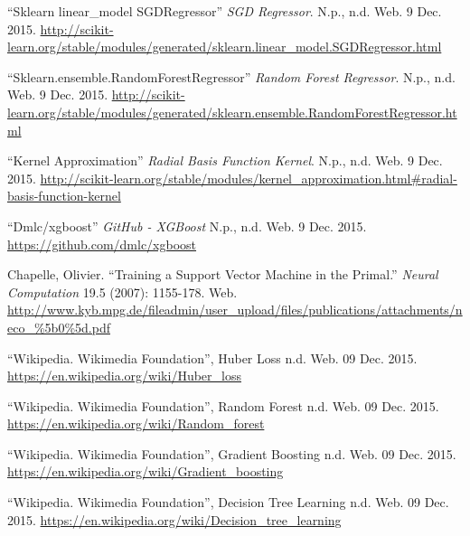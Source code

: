 \documentclass[12pt,a4paper]{article}
\begin{document}
\begin{thebibliography}{9}
	\enquote{Sklearn linear\_model SGDRegressor} \textit{SGD Regressor}. N.p., n.d. Web. 9 Dec. 2015. \href{http://scikit-learn.org/stable/modules/generated/sklearn.linear_model.SGDRegressor.html}{\url{http://scikit-learn.org/stable/modules/generated/sklearn.linear_model.SGDRegressor.html}}
	
	\enquote{Sklearn.ensemble.RandomForestRegressor} \textit{Random Forest Regressor}. N.p., n.d. Web. 9 Dec. 2015. \href{http://scikit-learn.org/stable/modules/generated/sklearn.ensemble.RandomForestRegressor.html}{\url{http://scikit-learn.org/stable/modules/generated/sklearn.ensemble.RandomForestRegressor.html}}
	
	\enquote{Kernel Approximation} \textit{Radial Basis Function Kernel}. N.p., n.d. Web. 9 Dec. 2015. \href{http://scikit-learn.org/stable/modules/kernel_approximation.html\#radial-basis-function-kernel}{\url{http://scikit-learn.org/stable/modules/kernel_approximation.html\#radial-basis-function-kernel}}
	
	
	\enquote{Dmlc/xgboost} \textit{GitHub - XGBoost} N.p., n.d. Web. 9 Dec. 2015. \href{https://github.com/dmlc/xgboost}{\url{https://github.com/dmlc/xgboost}}
	
	Chapelle, Olivier. \enquote{Training a Support Vector Machine in the Primal.} \textit{Neural Computation} 19.5 (2007): 1155-178. Web.
	\href{http://www.kyb.mpg.de/fileadmin/user_upload/files/publications/attachments/neco_\%5b0\%5d.pdf}{\url{http://www.kyb.mpg.de/fileadmin/user_upload/files/publications/attachments/neco_\%5b0\%5d.pdf}}
	
	\enquote{Wikipedia. Wikimedia Foundation}, Huber Loss n.d. Web. 09 Dec. 2015. \href{https://en.wikipedia.org/wiki/Huber_loss}{\url{https://en.wikipedia.org/wiki/Huber_loss}}
	
	\enquote{Wikipedia. Wikimedia Foundation}, Random Forest n.d. Web. 09 Dec. 2015. \href{https://en.wikipedia.org/wiki/Random_forest}{\url{https://en.wikipedia.org/wiki/Random_forest}}
	
	\enquote{Wikipedia. Wikimedia Foundation}, Gradient Boosting n.d. Web. 09 Dec. 2015. \href{https://en.wikipedia.org/wiki/Gradient_boosting}{\url{https://en.wikipedia.org/wiki/Gradient_boosting}}
	
	\enquote{Wikipedia. Wikimedia Foundation}, Decision Tree Learning n.d. Web. 09 Dec. 2015. \href{https://en.wikipedia.org/wiki/Decision_tree_learning}{\url{https://en.wikipedia.org/wiki/Decision_tree_learning}}
	

\end{thebibliography}
\end{document}
